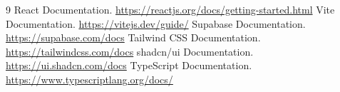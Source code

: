 \documentclass[12pt,a4paper]{report}
\begin{document}
\newpage
\setcounter{page}{1}









\newpage
\begin{thebibliography}{9}
React Documentation. \url{https://reactjs.org/docs/getting-started.html}
Vite Documentation. \url{https://vitejs.dev/guide/}
Supabase Documentation. \url{https://supabase.com/docs}
Tailwind CSS Documentation. \url{https://tailwindcss.com/docs}
shadcn/ui Documentation. \url{https://ui.shadcn.com/docs}
TypeScript Documentation. \url{https://www.typescriptlang.org/docs/}
\end{thebibliography}
\end{document}
